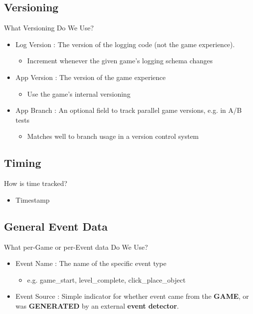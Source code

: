 \documentclass{beamer}
\begin{document}
\subsection[versions]{Versioning}

\begin{frame}{What Versioning Do We Use?}
  \begin{itemize}
    \item \alert{Log Version :} The version of the logging code (not the game experience).
    \begin{itemize}
      \item Increment whenever the given game's logging schema changes
    \end{itemize}
    \item \alert{App Version :} The version of the game experience
    \begin{itemize}
      \item Use the game's internal versioning
    \end{itemize}
    \item \alert{App Branch :} An optional field to track parallel game versions, e.g. in A/B tests
    \begin{itemize}
      \item Matches well to branch usage in a version control system
    \end{itemize}
  \end{itemize}
\end{frame}

\subsection[timing]{Timing}

\begin{frame}{How is time tracked?}
  \begin{itemize}
    \item \alert{Timestamp}
  \end{itemize}
\end{frame}

\subsection[data]{General Event Data}

\begin{frame}{What per-Game or per-Event data Do We Use?}
  \begin{itemize}
    \item \alert{Event Name} : The name of the specific event type
    \begin{itemize}
      \item e.g. game\_start, level\_complete, click\_place\_object
    \end{itemize}
    \item \alert{Event Source :} Simple indicator for whether event came from the \textbf{GAME}, or was \textbf{GENERATED} by an external \textbf{event detector}.
  \end{itemize}
\end{frame}
\end{document}
